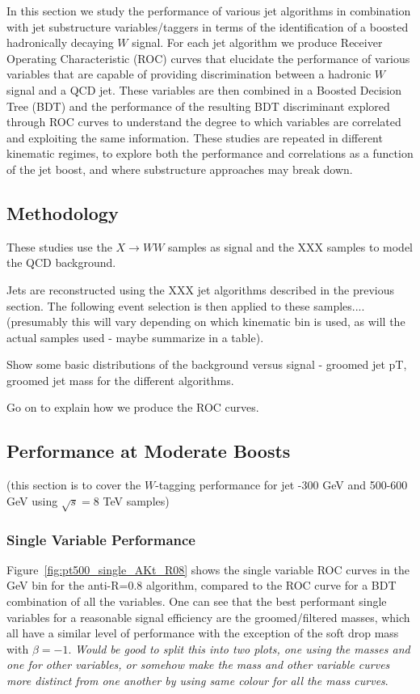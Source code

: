 In this section we study the performance of various jet algorithms in
combination with jet substructure variables/taggers in terms of the
identification of a boosted hadronically decaying $W$ signal. For each
jet algorithm we produce Receiver Operating Characteristic (ROC)
curves that elucidate the performance of various variables that are
capable of providing discrimination between a hadronic $W$ signal and
a QCD jet. These variables are then combined in a Boosted Decision Tree (BDT) and the performance of the resulting BDT discriminant
explored through ROC curves to understand the degree to which
variables are correlated and exploiting the same information. These
studies are repeated in different kinematic regimes, to explore both
the performance and correlations as a function of the jet boost, and
where substructure approaches may break down.

\subsection{Methodology}

These studies use the $X \rightarrow WW$ samples as signal and the XXX
samples to model the QCD background. 

Jets are reconstructed using the XXX jet algorithms described in the
previous section. The following event selection is then applied to these
samples....(presumably this will vary depending on which kinematic bin
is used, as will the actual samples used - maybe summarize in a table).

Show some basic distributions of the background versus signal -
groomed jet pT, groomed jet mass for the different algorithms.

Go on to explain how we produce the ROC curves.

\subsection{Performance at Moderate Boosts}

(this section is to cover the $W$-tagging performance for jet -300 GeV and
500-600 GeV using $\sqrt{s} = 8$ TeV samples)

\subsubsection{Single Variable Performance}

Figure~\ref{fig:pt500_single_AKt_R08} shows the single variable ROC curves in
the  GeV bin for the anti-\kT R=0.8 algorithm, compared to the
ROC curve for a BDT combination of all the variables. One can see that
the best performant single variables for a reasonable signal
efficiency are the groomed/filtered masses, which all have a similar
level of performance with the exception of the soft drop mass with $\beta=-1$. {\it Would be good to split this into two plots, one
using the masses and one for other variables, or somehow make the mass
and other variable curves more distinct from one another by using same
colour for all the mass curves}.


